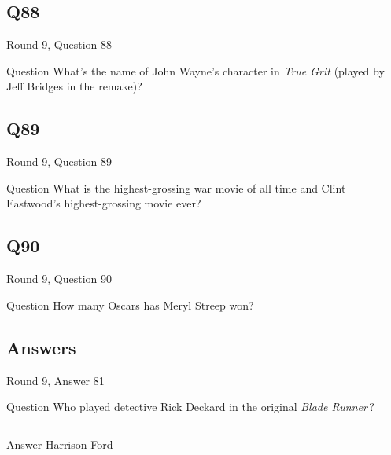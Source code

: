 \documentclass[11pt]{beamer}
\begin{document}
\subsection*{Q88}
\begin{frame}[t]{Round 9, Question 88}
  \vspace{2em}
  \begin{block}{Question}
    What's the name of John Wayne's character in \emph{True Grit} (played by Jeff Bridges in the remake)?
  \end{block}
\end{frame}


\subsection*{Q89}
\begin{frame}[t]{Round 9, Question 89}
  \vspace{2em}
  \begin{block}{Question}
    What is the highest-grossing war movie of all time and Clint Eastwood's highest-grossing movie ever?
  \end{block}
\end{frame}


\subsection*{Q90}
\begin{frame}[t]{Round 9, Question 90}
  \vspace{2em}
  \begin{block}{Question}
    How many Oscars has Meryl Streep won?
  \end{block}
\end{frame}

\subsection{Answers}

\begin{frame}[t]{Round 9, Answer 81}
  \vspace{2em}
  \begin{block}{Question}
    Who played detective Rick Deckard in the original \emph{Blade Runner}\,?
  \end{block}
  \pause{}
  \begin{columns}[T,totalwidth=\linewidth]
    \begin{column}{0.35\linewidth}
      \begin{block}{Answer}
        Harrison Ford
      \end{block}
    \end{column}
    \begin{column}{0.6\linewidth}
      \begin{center}
        \texttt{[image: \{Images/Deckard-Blade-Runner-profile-a]}.jpg}
      \end{center}
    \end{column}
  \end{columns}
\end{frame}
\end{document}

